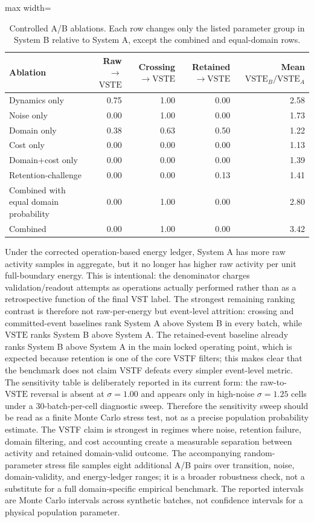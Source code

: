 \documentclass[11pt,a4paper]{article}
\newcommand{\VSTE}{\ensuremath{\mathrm{VSTE}}}
\newcommand{\1}{\mathbf{1}}
\begin{document}
\begin{table}[h]
\centering
\caption{Controlled A/B ablations. Each row changes only the listed parameter group in System B relative to System A, except the combined and equal-domain rows.}
\label{tab:hmm-ablations}
\small
\begin{adjustbox}{max width=\linewidth}
\begin{tabular}{lrrrr}
\toprule
Ablation & Raw$\to$\VSTE{} & Crossing$\to$\VSTE{} & Retained$\to$\VSTE{} & Mean $\VSTE_B/\VSTE_A$ \\
\midrule
Dynamics only & 0.75 & 1.00 & 0.00 & 2.58 \\
Noise only & 0.00 & 1.00 & 0.00 & 1.73 \\
Domain only & 0.38 & 0.63 & 0.50 & 1.22 \\
Cost only & 0.00 & 0.00 & 0.00 & 1.13 \\
Domain+cost only & 0.00 & 0.00 & 0.00 & 1.39 \\
Retention-challenge & 0.00 & 0.00 & 0.13 & 1.41 \\
Combined with equal domain probability & 0.00 & 1.00 & 0.00 & 2.80 \\
Combined & 0.00 & 1.00 & 0.00 & 3.42 \\
\bottomrule
\end{tabular}
\end{adjustbox}
\end{table}

Under the corrected operation-based energy ledger, System A has more raw activity samples in aggregate, but it no longer has higher raw activity per unit full-boundary energy. This is intentional: the denominator charges validation/readout attempts as operations actually performed rather than as a retrospective function of the final VST label. The strongest remaining ranking contrast is therefore not raw-per-energy but event-level attrition: crossing and committed-event baselines rank System A above System B in every batch, while \VSTE{} ranks System B above System A. The retained-event baseline already ranks System B above System A in the main locked operating point, which is expected because retention is one of the core VSTF filters; this makes clear that the benchmark does not claim VSTF defeats every simpler event-level metric. The sensitivity table is deliberately reported in its current form: the raw-to-\VSTE{} reversal is absent at $\sigma=1.00$ and appears only in high-noise $\sigma=1.25$ cells under a 30-batch-per-cell diagnostic sweep. Therefore the sensitivity sweep should be read as a finite Monte Carlo stress test, not as a precise population probability estimate. The VSTF claim is strongest in regimes where noise, retention failure, domain filtering, and cost accounting create a measurable separation between activity and retained domain-valid outcome. The accompanying random-parameter stress file samples eight additional A/B pairs over transition, noise, domain-validity, and energy-ledger ranges; it is a broader robustness check, not a substitute for a full domain-specific empirical benchmark. The reported intervals are Monte Carlo intervals across synthetic batches, not confidence intervals for a physical population parameter.
\end{document}
